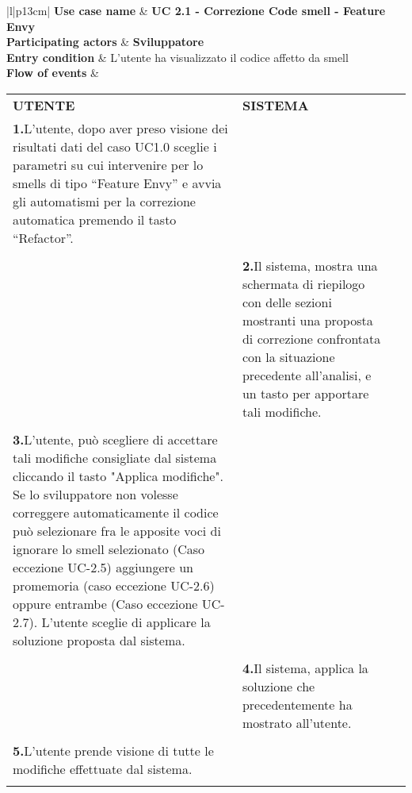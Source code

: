 		\begin{tabular}{|l|p{13cm}|}
			\hline
			\textbf{Use case name}  & \textbf{UC 2.1 - Correzione Code smell - Feature Envy} \\ \hline
			\textbf{Participating actors}  & \textbf{Sviluppatore} \\ \hline
			\textbf{Entry condition}  & L’utente ha visualizzato il codice affetto da smell  \\  \hline
			\textbf{Flow of events}  &  
			\begin{tabular}{p{6cm}p{6cm}p{6cm}}
				\centering \textbf{UTENTE} & \centering \textbf{SISTEMA} & \\
				\textbf{1.}\hspace{0.3cm}L’utente, dopo aver preso visione dei risultati dati del caso UC1.0 sceglie i parametri su cui intervenire per lo smells di tipo “Feature Envy” e avvia gli automatismi per la correzione automatica premendo il tasto “Refactor”.
				\\ \\ &
				\textbf{2.}\hspace{0.3cm}Il sistema, mostra una schermata di riepilogo con delle sezioni mostranti una proposta di correzione   confrontata con la situazione precedente all’analisi, e un tasto per apportare tali modifiche. \\ \\
				
				\textbf{3.}\hspace{0.3cm}L’utente, può scegliere di accettare tali modifiche consigliate dal sistema cliccando il tasto "Applica modifiche". Se lo sviluppatore non volesse correggere automaticamente il codice può   selezionare fra le   apposite voci di ignorare lo smell selezionato (Caso eccezione UC-2.5)   aggiungere un promemoria (caso eccezione UC-2.6) oppure entrambe (Caso eccezione   UC-2.7). L'utente sceglie di applicare la soluzione proposta dal sistema.
				\\ \\ &
				\textbf{4.}\hspace{0.3cm}Il sistema, applica la soluzione che precedentemente ha mostrato all'utente. \\ \\
				
				\textbf{5.}\hspace{0.3cm}L'utente prende visione di tutte le modifiche effettuate dal sistema. \\ \\
				

\end{tabular}
\end{tabular}
